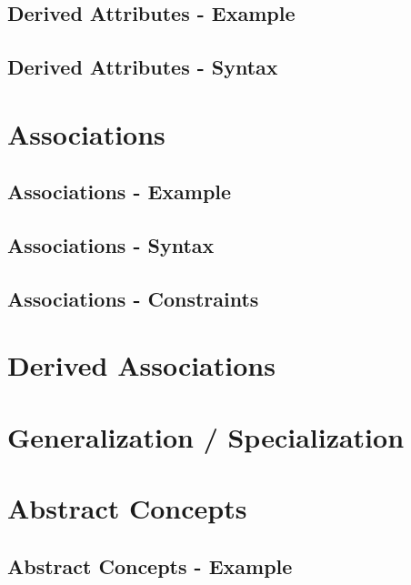 \documentclass[a4paper,oneside,12pt, extrafontsizes]{memoir}
\theoremstyle{definition}
\theoremstyle{definition}
\theoremstyle{definition}
\theoremstyle{definition}
\begin{document}
\section{Derived Attributes - Example}


\section{Derived Attributes - Syntax}


\chapter{Associations}
\label{ch:associations}


\section{Associations - Example}


\section{Associations - Syntax}


\section{Associations - Constraints}


\chapter{Derived Associations}
\label{ch:derived-associations}

\chapter{Generalization / Specialization}
\label{ch:generalization}


\chapter{Abstract Concepts}
\label{ch:abstract}


\section{Abstract Concepts - Example}

\end{document}
